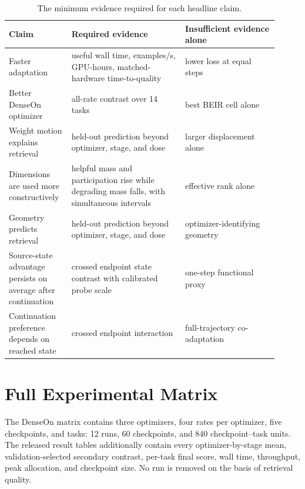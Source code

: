 \documentclass[11pt]{article}
\begin{document}
\begin{table}[t]
\centering
\small
\begin{tabular}{p{0.20\linewidth}p{0.39\linewidth}p{0.32\linewidth}}
\toprule
Claim & Required evidence & Insufficient evidence alone \\
\midrule
Faster adaptation & useful wall time, examples/s, GPU-hours, matched-hardware time-to-quality & lower loss at equal steps \\
Better DenseOn optimizer & all-rate contrast over 14 tasks & best BEIR cell alone \\
Weight motion explains retrieval & held-out prediction beyond optimizer, stage, and dose & larger displacement alone \\
Dimensions are used more constructively & helpful mass and participation rise while degrading mass falls, with simultaneous intervals & effective rank alone \\
Geometry predicts retrieval & held-out prediction beyond optimizer, stage, and dose & optimizer-identifying geometry \\
Source-state advantage persists on average after continuation & crossed endpoint state contrast with calibrated probe scale & one-step functional proxy \\
Continuation preference depends on reached state & crossed endpoint interaction & full-trajectory co-adaptation \\
\bottomrule
\end{tabular}
\caption{The minimum evidence required for each headline claim.}
\label{tab:claim-firewall}
\end{table}

\section{Full Experimental Matrix}

The DenseOn matrix contains three optimizers, four rates per optimizer, five
checkpoints, and \NumBEIRTasks{} tasks: 12 runs, 60 checkpoints, and 840 checkpoint--task units.
The released result tables additionally contain every optimizer-by-stage mean, validation-selected
secondary contrast, per-task final score, wall time, throughput, peak allocation, and checkpoint
size. No run is removed on the basis of retrieval quality.
\end{document}
